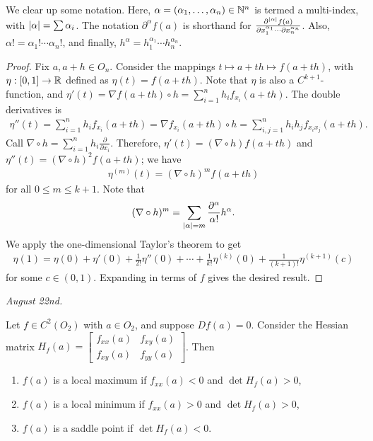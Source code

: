 We clear up some notation. Here, $\alpha = (\alpha_{1},\ldots,\alpha_{n}) \in \mathbb{N}^{n}$ is termed a multi-index, with $\left| \alpha \right| = \sum \alpha_{i}$. The notation $\partial^{\alpha}f(a)$ is shorthand for $\frac{\partial^{\left| \alpha \right|}f(a)}{\partial x_{1}^{\alpha_{1}} \cdots \partial x_{n}^{\alpha_{n}}}$. Also, $\alpha! = \alpha_{1}! \cdots \alpha_{n}!$, and finally, $h^{\alpha} = h_{1}^{\alpha_{1}} \cdots h_{n}^{\alpha_{n}}$.

\begin{proof}
    Fix $a,a+h \in O_{n}$. Consider the mappings $t \mapsto a+th \mapsto f(a+th)$, with $\eta:[0,1] \to \mathbb{R}$ defined as $\eta(t) = f(a+th)$. Note that $\eta$ is also a $C^{k+1}$-function, and $\eta'(t) = \nabla f(a+th) \circ h = \sum_{i=1}^{n} h_{i}f_{x_{i}}(a+th)$. The double derivatives is
    \begin{align}
        \eta''(t) = \sum_{i=1}^{n} h_{i}f_{x_{i}}(a+th) = \nabla f_{x_{i}}(a+th) \circ h = \sum_{i,j=1}^{n} h_{i}h_{j}f_{x_{i}x_{j}}(a+th).
    \end{align}
    Call $\nabla \circ h = \sum_{i=1}^{n} h_{i} \frac{\partial}{\partial x_{i}}$. Therefore, $\eta'(t) = (\nabla \circ h) f(a+th)$ and $\eta''(t) = (\nabla \circ h)^{2}f(a+th)$; we have
    \begin{align}
        \eta^{(m)}(t) = (\nabla \circ h)^{m}f(a+th)
    \end{align}
    for all $0 \leq m \leq k+1$. Note that 
    \begin{align}
        (\nabla \circ h)^{m} = \sum_{\left| \alpha \right|=m} \frac{\partial^{\alpha}}{\alpha!}h^{\alpha}.
    \end{align}
    We apply the one-dimensional Taylor's theorem to get
    \begin{align}
        \eta(1) = \eta(0) + \eta'(0) + \frac{1}{2!}\eta''(0) + \cdots + \frac{1}{k!}\eta^{(k)}(0) + \frac{1}{(k+1)!} \eta^{(k+1)} (c)
    \end{align}
    for some $c \in (0,1)$. Expanding in terms of $f$ gives the desired result.
\end{proof}

\noindent \textit{August 22nd.}

\begin{theorem}
    Let $f \in C^{2}(O_{2})$ with $a \in O_{2}$, and suppose $Df(a) = 0$. Consider the Hessian matrix $H_{f}(a) = \begin{bmatrix}
        f_{xx}(a) & f_{xy}(a) \\ f_{xy}(a) & f_{yy}(a)
    \end{bmatrix}$. Then
    \begin{enumerate}
        \item $f(a)$ is a local maximum if $f_{xx}(a) < 0$ and $\det H_{f}(a) > 0$,
        \item $f(a)$ is a local minimum if $f_{xx}(a) > 0$ and $\det H_{f}(a) > 0$,
        \item $f(a)$ is a saddle point if $\det H_{f}(a) < 0$.
    \end{enumerate}
\end{theorem}

